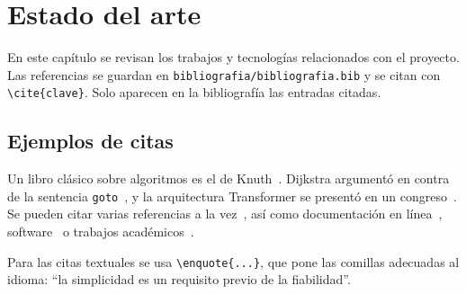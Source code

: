 
\chapter{Estado del arte}
\label{cap:estado-arte}

En este capítulo se revisan los trabajos y tecnologías relacionados con el proyecto. Las referencias se guardan en \texttt{bibliografia/bibliografia.bib} y se citan con \verb|\cite{clave}|. Solo aparecen en la bibliografía las entradas citadas.

\section{Ejemplos de citas}

Un libro clásico sobre algoritmos es el de Knuth~\cite{knuth1997}. Dijkstra argumentó en contra de la sentencia \texttt{goto}~\cite{dijkstra1968}, y la arquitectura Transformer se presentó en un congreso~\cite{vaswani2017}. Se pueden citar varias referencias a la vez~\cite{knuth1997,dijkstra1968,vaswani2017}, así como documentación en línea~\cite{python-docs}, software~\cite{latex-project} o trabajos académicos~\cite{apellido2025}.

Para las citas textuales se usa \verb|\enquote{...}|, que pone las comillas adecuadas al idioma: \enquote{la simplicidad es un requisito previo de la fiabilidad}.
